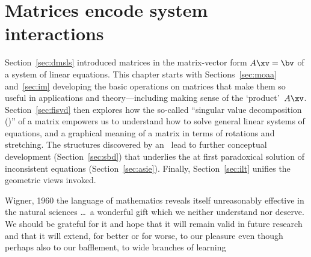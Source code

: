 
\chapter{Matrices encode system interactions}
\label{ch:m}

\minitoc




Section~\ref{sec:dmsls} introduced matrices in the matrix-vector form \(A\xv=\bv\) of a system of linear equations.
This chapter starts with Sections~\ref{sec:moaa} and~\ref{sec:im} developing the basic operations on matrices that make them so useful in applications and theory---including making sense of the `product'~\(A\xv\).
Section~\ref{sec:fisvd} then explores how the so-called ``singular value decomposition (\svd)'' of a matrix empowers us to understand how to solve general linear systems of equations, and a graphical meaning of a matrix in terms of rotations and stretching.
The structures discovered by an \svd\ lead to further conceptual development (Section~\ref{sec:sbd}) that underlies the at first paradoxical solution of inconsistent equations (Section~\ref{sec:asie}).
Finally, Section~\ref{sec:ilt} unifies the geometric views invoked.



\begin{quoted}{Wigner, 1960 \cite[p.3]{Mandelbrot1982}}
the language of mathematics reveals itself unreasonably effective in the natural sciences \ldots\ a wonderful gift which we neither understand nor deserve.  We should be grateful for it and hope that it will remain valid in future research and that it will extend, for better or for worse, to our pleasure even though perhaps also to our bafflement, to wide branches of learning
\end{quoted}


